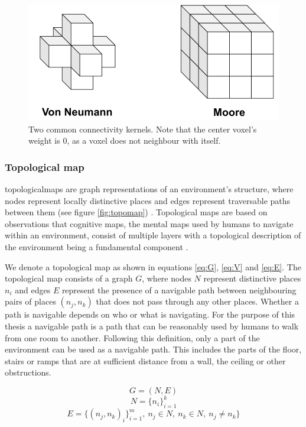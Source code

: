\begin{figure}[h]
    \centering
    \includegraphics*[width=.7\textwidth]{./fig/voxel_neighbourhood.pdf}
    \caption{Two common connectivity kernels. Note that the center voxel's weight is 0, as a voxel does not neighbour with itself.}
    \label{fig:vg_nbs}
\end{figure}

\newpage


\subsubsection{Topological map}
\Gls{topologicalmap}s are graph representations of an environment's structure, where nodes represent locally distinctive places and edges represent traversable paths between them  (see figure \ref{fig:topomap}) \citep{thrun_learning_1998,kuipers_robust_1988}. Topological maps are based on observations that cognitive maps, the mental maps used by humans to navigate within an environment, consist of multiple layers with a topological description of the environment being a fundamental component \citep{kuipers_robust_1988,kuipers_modeling_1978}. 

We denote a topological map as shown in equations \ref{eq:G}, \ref{eq:V} and \ref{eq:E}. The topological map consists of a graph \(G\), where nodes \(N\) represent distinctive places \(n_i\) and edges \(E\) represent the presence of a navigable path between neighbouring pairs of places \((n_j,n_k)\) that does not pass through any other places. Whether a path is navigable depends on who or what is navigating. For the purpose of this thesis a navigable path is a path that can be reasonably used by humans to walk from one room to another. Following this definition, only a part of the environment can be used as a navigable path. This includes the parts of the floor, stairs or ramps that are at sufficient distance from a wall, the ceiling or other obstructions.


\begin{equation}
    \label{eq:G}
    G=(N, E)
\end{equation}
\begin{equation}
    \label{eq:V}
    N=\{n_i\}_{i=1}^k
\end{equation}
\begin{equation}
    \label{eq:E}
    E=\{(n_j,n_k)_i\}_{i=1}^m,\ n_j \in N,\ n_k \in N,\ n_j \neq n_k\}
\end{equation}

